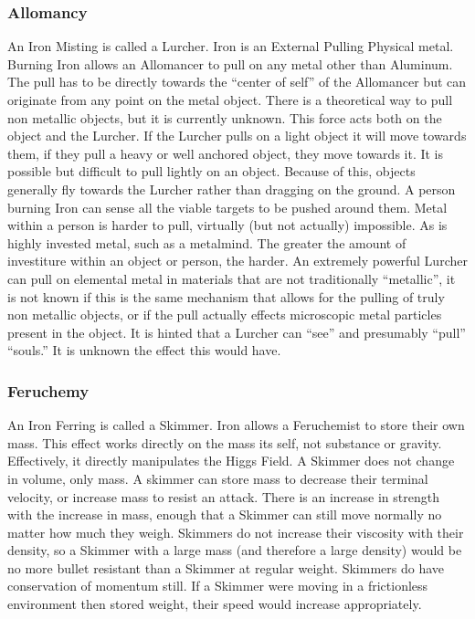 \documentclass[conference]{IEEEtran}
\begin{document}
\subsubsection*{\textbf{Allomancy}}
An Iron Misting is called a Lurcher.\cite{ARS}  Iron is an External Pulling Physical metal.\cite{AL-TB}  Burning Iron allows an Allomancer to pull on any metal\cite{ARS} other than Aluminum.\cite{BoM-CH2}  The pull has to be directly towards the ``center of self''\cite{CoS} of the Allomancer but can originate from any point on the metal object.\cite{TFE-CH34}  There is a theoretical way to pull non metallic objects, but it is currently unknown.\cite{non-metal}\cite{BoM-CH28}
This force acts both on the object and the Lurcher. If the Lurcher pulls on a light object it will move towards them, if they pull a heavy or well anchored object, they move towards it.\cite{TFE-CH7}
It is possible but difficult to pull lightly on an object.\cite{TFE-CH7}\cite{WoA-CH17}  Because of this, objects generally fly towards the Lurcher rather than dragging on the ground.
A person burning Iron can sense all the viable targets to be pushed around them.\cite{TFE-CH7}
Metal within a person is harder to pull,\cite{TFE-CH7} virtually (but not actually) impossible.\cite{TFE-CH38}\cite{HoA-CH73}  As is highly invested metal, such as a metalmind.\cite{SoS-CH7} The greater the amount of investiture within an object or person, the harder.\cite{invest-resist}
An extremely powerful Lurcher can pull on elemental metal in materials that are not traditionally ``metallic'',\cite{BoM-CH28} it is not known if this is the same mechanism that allows for the pulling of truly non metallic objects, or if the pull actually effects microscopic metal particles present in the object.\cite{non-metal}
It is hinted that a Lurcher can ``see'' and presumably ``pull'' ``souls.''\cite{BoM-CH28}  It is unknown the effect this would have.\\

\subsubsection*{\textbf{Feruchemy}}
An Iron Ferring is called a Skimmer.\cite{ARS}  Iron allows a Feruchemist to store their own mass.\cite{ARS}  This effect works directly on the mass its self, not substance or gravity.  Effectively, it directly manipulates the Higgs Field.\cite{higgs}  A Skimmer does not change in volume, only mass.  A skimmer can store mass to decrease their terminal velocity,\cite{BoM-CH12} or increase mass to resist an attack.\cite{HoA-CH78}  There is an increase in strength with the increase in mass, enough that a Skimmer can still move normally no matter how much they weigh.\cite{WoA-CH52}
Skimmers do not increase their viscosity with their density, so a Skimmer with a large mass (and therefore a large density) would be no more bullet resistant than a Skimmer at regular weight.\cite{gunshot-weak}
Skimmers do have conservation of momentum still.\cite{BoM-CH12}  If a Skimmer were moving in a frictionless environment then stored weight, their speed would increase appropriately.
\end{document}
